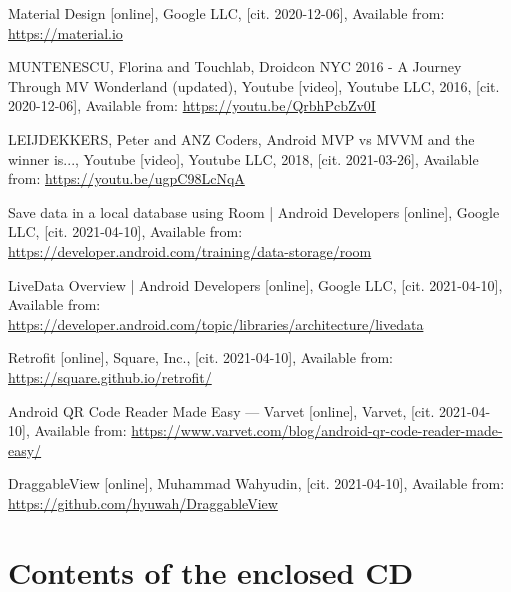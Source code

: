 \documentclass[thesis=B,english]{FITthesis}[2019/12/23]
\begin{document}
\begin{thebibliography}{9}

 Material Design [online], Google LLC, [cit. 2020-12-06], Available from: \url{https://material.io}

 MUNTENESCU, Florina and Touchlab, Droidcon NYC 2016 - A Journey Through MV Wonderland (updated), Youtube [video], Youtube LLC, 2016, [cit. 2020-12-06], Available from: \url{https://youtu.be/QrbhPcbZv0I}

 LEIJDEKKERS, Peter and ANZ Coders, Android MVP vs MVVM and the winner is..., Youtube [video], Youtube LLC, 2018, [cit. 2021-03-26], Available from: \url{https://youtu.be/ugpC98LcNqA}

 Save data in a local database using Room | Android Developers [online], Google LLC, [cit. 2021-04-10], Available from: \url{https://developer.android.com/training/data-storage/room}

 LiveData Overview | Android Developers [online], Google LLC, [cit. 2021-04-10], Available from: \url{https://developer.android.com/topic/libraries/architecture/livedata}

 Retrofit [online], Square, Inc., [cit. 2021-04-10], Available from: \url{https://square.github.io/retrofit/}

 Android QR Code Reader Made Easy — Varvet [online], Varvet, [cit. 2021-04-10], Available from: \url{https://www.varvet.com/blog/android-qr-code-reader-made-easy/}

 DraggableView [online], Muhammad Wahyudin, [cit. 2021-04-10], Available from: \url{https://github.com/hyuwah/DraggableView}

\end{thebibliography}

\chapter{Contents of the enclosed CD}

\begin{figure}
\end{figure}

%
\end{document}
